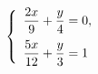 \begin{ex}
	\begin{condition}
		\( \left\{
		\begin{array}{l}
			\dfrac{2x}{9}+\dfrac{y}{4}=0,\vspace{0,2cm}\\
			\dfrac{5x}{12}+\dfrac{y}{3}=1
		\end{array}
		\right. \)
	\end{condition}
\end{ex}